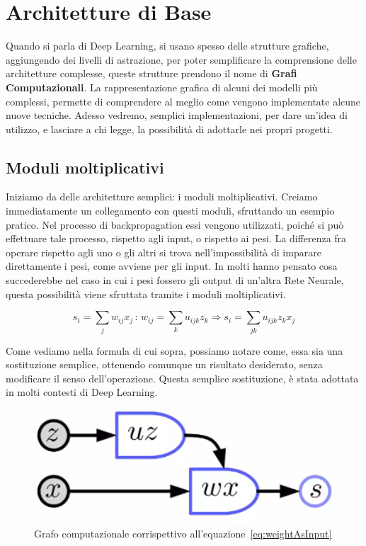 \chapter{Architetture di Base}

Quando si parla di Deep Learning, si usano spesso delle strutture grafiche, aggiungendo dei livelli di astrazione, per poter semplificare la comprensione delle architetture complesse, queste strutture prendono il nome di \textbf{Grafi Computazionali}. La rappresentazione grafica di alcuni dei modelli più complessi, permette di comprendere al meglio come vengono implementate alcune nuove tecniche. Adesso vedremo, semplici implementazioni, per dare un'idea di utilizzo, e lasciare a chi legge, la possibilità di adottarle nei propri progetti.

\section{Moduli moltiplicativi}
Iniziamo da delle architetture semplici: i moduli moltiplicativi. Creiamo immediatamente un collegamento con questi moduli, sfruttando un esempio pratico. Nel processo di backpropagation essi vengono utilizzati, poiché si può effettuare tale processo, rispetto agli input, o rispetto ai pesi. La differenza fra operare rispetto agli uno o gli altri si trova nell'impossibilità di imparare direttamente i pesi, come avviene per gli input. In molti hanno pensato cosa succederebbe nel caso in cui i pesi fossero gli output di un'altra Rete Neurale, questa possibilità viene sfruttata tramite i moduli moltiplicativi.

\begin{equation}
    s_i = \sum_{j}w_{ij}x_{j}\,:\, w_{ij}=\sum_ku_{ijk}z_k \Rightarrow s_i=\sum_{jk}u_{ijk}z_kx_j
    \label{eq:weightAsInput}
\end{equation}

Come vediamo nella formula di cui sopra, possiamo notare come, essa sia una sostituzione semplice, ottenendo comunque un risultato desiderato, senza modificare il senso dell'operazione. Questa semplice sostituzione, è stata adottata in molti contesti di Deep Learning.
\begin{figure}[htbp]
    \centering
    \includegraphics[width=0.4\linewidth]{figure/WeightAsInput.png}
    \caption{Grafo computazionale corrispettivo all'equazione~\ref{eq:weightAsInput}}
    \label{fig:wai}
\end{figure}

